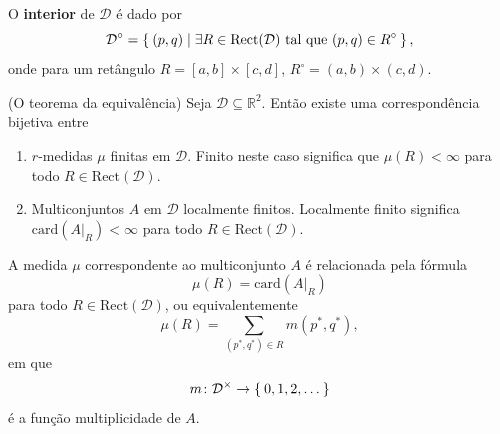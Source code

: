 O \textbf{interior} de $\mathcal{D}$ é dado por 
\begin{equation*}
    \mathcal{D}^\circ = \Set{(p,q) | \exists R \in \text{Rect}(\mathcal{D}) \text{ tal que } 
    (p,q) \in R^\circ},
\end{equation*}
onde para um retângulo $R = [a,b]\times[c,d]$, $R^\circ = (a,b)\times(c,d)$. 

\begin{teo}{(O teorema da equivalência)}\label{teo:equiv_meas}
    Seja $\mathcal{D} \subseteq \mathbb{R}^2$. Então existe uma correspondência bijetiva
    entre
    \begin{enumerate}
        \item $r$-medidas $\mu$ finitas em $\mathcal{D}$. Finito neste caso significa que 
        $\mu(R) < \infty$ para todo $R \in \text{Rect}(\mathcal{D})$.
        \item Multiconjuntos $A$ em $\mathcal{D}$ localmente finitos. Localmente finito significa
        $\text{card}(\left.A\right|_R) < \infty$ para todo $R \in \text{Rect}(\mathcal{D})$.
    \end{enumerate}
    A medida $\mu$ correspondente ao multiconjunto $A$ é relacionada pela fórmula
    \begin{equation}\label{eq:med_dgm}
        \mu(R) = \text{card}(\left.A\right|_R)
    \end{equation}
    para todo $R \in \text{Rect}(\mathcal{D})$, ou equivalentemente
    \begin{equation}\label{eq:med_mult}
        \mu(R) = \sum_{(p^*,q^*)\in R} m(p^*, q^*),
    \end{equation}
    em que
    \begin{equation*}
        m \colon \mathcal{D}^{\times} \to \Set{0,1,2,\dots}
    \end{equation*}
    é a função multiplicidade de $A$. 
\end{teo}
